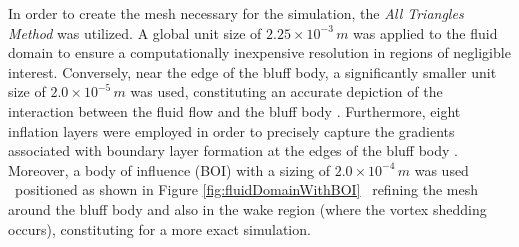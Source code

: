 In order to create the mesh necessary for the simulation, the \textit{All Triangles Method} was utilized. A global unit size of $2.25\times{10}^{-3}\,m$ was applied to the fluid domain to ensure a computationally inexpensive resolution in regions of negligible interest. Conversely, near the edge of the bluff body, a significantly smaller unit size of $2.0\times{10}^{-5}\,m$ was used, constituting an accurate depiction of the interaction between the fluid flow and the bluff body \parencite{ansys_learning_best_2023}. Furthermore, eight inflation layers were employed in order to precisely capture the gradients associated with boundary layer formation at the edges of the bluff body \parencite{fluid_mechanics_101_cfd_2021}. Moreover, a body of influence (BOI) with a sizing of $2.0\times{10}^{-4}\,m$ was used \textemdash\ positioned as shown in Figure \ref{fig:fluidDomainWithBOI} \textemdash\ refining the mesh around the bluff body and also in the wake region (where the vortex shedding occurs), constituting for a more exact simulation.  

